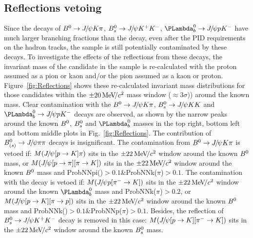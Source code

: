 \subsection{Reflections vetoing}
Since the decays of ${{B}^0}\rightarrow{\ensuremath{{J\mskip -3mu/\mskip -2mu\psi}}} K\pi$, ${{B}^0_{s}}\rightarrow{\ensuremath{{J\mskip -3mu/\mskip -2mu\psi}}}{\ensuremath{{K}^+}}{\ensuremath{{K}^-}}$, 
$\LbJpsipK$ have much larger branching fractions than the \LbJpsippi decay,
even after the PID requirements on the hadron tracks,
the \LbJpsippi sample is still potentially contaminated by these decays.
To investigate the effects of the reflections from these decays,
the invariant mass of the \Lb candidate in the \LbJpsippi sample is re-calculated
with the proton assumed as a pion or kaon and/or the pion assumed as a kaon or proton.
Figure~\ref{fig:Reflections} shows 
these re-calculated invariant mass distributions for those \LbJpsippi candidates 
within the $\pm20\text{\,Me\kern -0.1em V\!/}c^2$ mass window ($\approx3\sigma)$) around the known \Lb mass\supercite{PDG2020}.
Clear contamination with the ${{B}^0}\rightarrow{\ensuremath{{J\mskip -3mu/\mskip -2mu\psi}}} K\pi$, ${{B}^0_{s}}\rightarrow{\ensuremath{{J\mskip -3mu/\mskip -2mu\psi}}} K K$ and $\LbJpsipK$ decays are observed, 
as shown by the narrow peaks around the known ${{B}^0}$, ${{B}^0_{s}}$ and $\Lb$ masses in the top right, 
bottom left and bottom middle plots in Fig.~\ref{fig:Reflections}.
The contribution of $B^0_{({s})}\rightarrow{\ensuremath{{J\mskip -3mu/\mskip -2mu\psi}}}\pi\pi$ decays is insignificant.
The contamination from ${{B}^0}\rightarrow{\ensuremath{{J\mskip -3mu/\mskip -2mu\psi}}} K\pi$ is vetoed if:
$M({{J\mskip -3mu/\mskip -2mu\psi}} [{p}\rightarrow K]\pi)$ sits in the $\pm22\text{\,Me\kern -0.1em V\!/}c^2$ window around the known ${{B}^0}$ mass\supercite{PDG2020},
or $M({{J\mskip -3mu/\mskip -2mu\psi}} [{p}\rightarrow\pi][\pi\rightarrow K])$ sits in the $\pm22\text{\,Me\kern -0.1em V\!/}c^2$ window around the known ${{B}^0}$ mass 
and ProbNNpi(\proton)$>0.1$\&ProbNNk($\pi$)$>0.1$.
The contamination with the \LbJpsipK decay is vetoed if:
$M({{J\mskip -3mu/\mskip -2mu\psi}} {p}[{{\pi}^-}\rightarrow K])$ sits in the $\pm22\text{\,Me\kern -0.1em V\!/}c^2$ window around the known $\Lb$ mass\supercite{PDG2020} 
and ProbNNk($\pi$)$>0.2$,
or $M({{J\mskip -3mu/\mskip -2mu\psi}} [{p}\rightarrow K][\pi\rightarrow{\ensuremath{p}}])$ sits in the $\pm22\text{\,Me\kern -0.1em V\!/}c^2$ window around the known ${{B}^0}$ mass 
and ProbNNk(\proton)$>0.1$\&ProbNNp($\pi$)$>0.1$.
Besides, 
the reflection of ${{B}^0_{s}}\rightarrow{\ensuremath{{J\mskip -3mu/\mskip -2mu\psi}}}{\ensuremath{{K}^+}}{\ensuremath{{K}^-}}$ decay is removed in this case: 
$M({{J\mskip -3mu/\mskip -2mu\psi}} [{p}\rightarrow K][{{\pi}^-}\rightarrow K])$ sits in the $\pm22\text{\,Me\kern -0.1em V\!/}c^2$ window around the known ${{B}^0_{s}}$ mass\supercite{PDG2020}.


